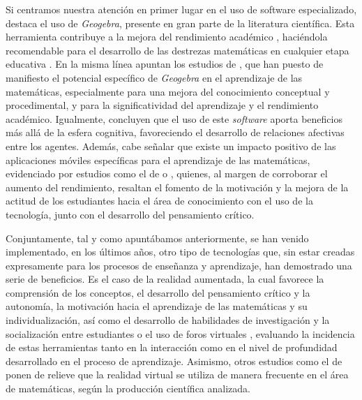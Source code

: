 \documentclass[spanish]{textolivre}
\begin{document}
Si centramos nuestra atención en primer lugar en el uso de software especializado, destaca el uso de \textit{Geogebra}, presente en gran parte de la literatura científica. Esta herramienta contribuye a la mejora del rendimiento académico \cite{ardic_effect_2018}, haciéndola recomendable para el desarrollo de las destrezas matemáticas en cualquier etapa educativa \cite{alabdulaziz_effectiveness_2021}. En la misma línea apuntan los estudios de \textcite{birgin_effect_2020,munante-toledo_geogebra_2021,zulnaidi_effect_2019}, que han puesto de manifiesto el potencial específico de \textit{Geogebra} en el aprendizaje de las matemáticas, especialmente para una mejora del conocimiento conceptual y procedimental, y para la significatividad del aprendizaje y el rendimiento académico. Igualmente, \textcite{garcia_efectos_2021} concluyen que el uso de este \textit{software} aporta beneficios más allá de la esfera cognitiva, favoreciendo el desarrollo de relaciones afectivas entre los agentes. Además, cabe señalar que existe un impacto positivo de las aplicaciones móviles específicas para el aprendizaje de las matemáticas, evidenciado por estudios como el de \textcite{rodriguez-cubillo_uso_2021} o \textcite{alabdulaziz_covid-19_2021}, quienes, al margen de corroborar el aumento del rendimiento, resaltan el fomento de la motivación y la mejora de la actitud de los estudiantes hacia el área de conocimiento con el uso de la tecnología, junto con el desarrollo del pensamiento crítico.

Conjuntamente, tal y como apuntábamos anteriormente, se han venido implementado, en los últimos años, otro tipo de tecnologías que, sin estar creadas expresamente para los procesos de enseñanza y aprendizaje, han demostrado una serie de beneficios. Es el caso de la realidad aumentada, la cual favorece la comprensión de los conceptos, el desarrollo del pensamiento crítico y la autonomía, la motivación hacia el aprendizaje de las matemáticas y su individualización, así como el desarrollo de habilidades de investigación y la socialización entre estudiantes \cite{fernandez-enriquez_augmented_2020,kramarenko_prospects_2019} o el uso de foros virtuales \cite{juarez__interaccion_2020}, evaluando la incidencia de estas herramientas tanto en la interacción como en el nivel de profundidad desarrollado en el proceso de aprendizaje. Asimismo, otros estudios como el de \textcite{menjivar__revision_2021} ponen de relieve que la realidad virtual se utiliza de manera frecuente en el área de matemáticas, según la producción científica analizada.
\end{document}
